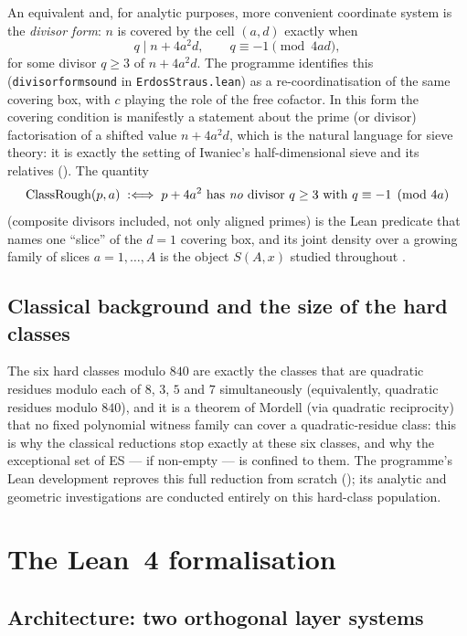 \documentclass[11pt]{article}
\theoremstyle{plain}
\theoremstyle{definition}
\theoremstyle{remark}
\newcommand{\file}[1]{\texttt{#1}}
\newcommand{\lean}[1]{\texttt{#1}}
\renewcommand{\_}{\textunderscore\allowbreak}
\begin{document}
An equivalent and, for analytic purposes, more convenient coordinate system is the
\emph{divisor form}: $n$ is covered by the cell $(a,d)$ exactly when
\[
q \mid n + 4a^2 d, \qquad q \equiv -1 \pmod{4ad},
\]
for some divisor $q\ge 3$ of $n+4a^2d$. The programme identifies this (\lean{divisor\_form\_sound}
in \file{ErdosStraus.lean}) as a re-coordinatisation of the same covering box, with $c$ playing
the role of the free cofactor. In this form the covering condition is manifestly a statement
about the prime (or divisor) factorisation of a shifted value $n+4a^2d$, which is the natural
language for sieve theory: it is exactly the setting of Iwaniec's half-dimensional sieve and its
relatives (). The quantity
\[
\mathrm{ClassRough}(p,a) \;:\Longleftrightarrow\; p+4a^2 \text{ has \emph{no} divisor } q\ge 3
\text{ with } q\equiv -1 \pmod{4a}
\]
(composite divisors included, not only aligned primes) is the Lean predicate that names one
``slice'' of the $d=1$ covering box, and its joint density over a growing family of slices
$a=1,\dots,A$ is the object $S(A,x)$ studied throughout .

\subsection{Classical background and the size of the hard classes}

The six hard classes modulo $840$ are exactly the classes that are quadratic residues modulo
each of $8$, $3$, $5$ and $7$ simultaneously (equivalently, quadratic residues modulo $840$),
and it is a theorem of Mordell (via quadratic reciprocity) that no fixed polynomial witness
family can cover a quadratic-residue class: this is why the classical reductions stop exactly
at these six classes, and why the exceptional set of ES --- if non-empty --- is confined to
them. The programme's Lean development reproves this full reduction from scratch
(); its analytic and geometric investigations are conducted entirely on
this hard-class population.


\section{The Lean~4 formalisation}
\label{sec:lean}

\subsection{Architecture: two orthogonal layer systems}
\label{subsec:architecture}
\end{document}
